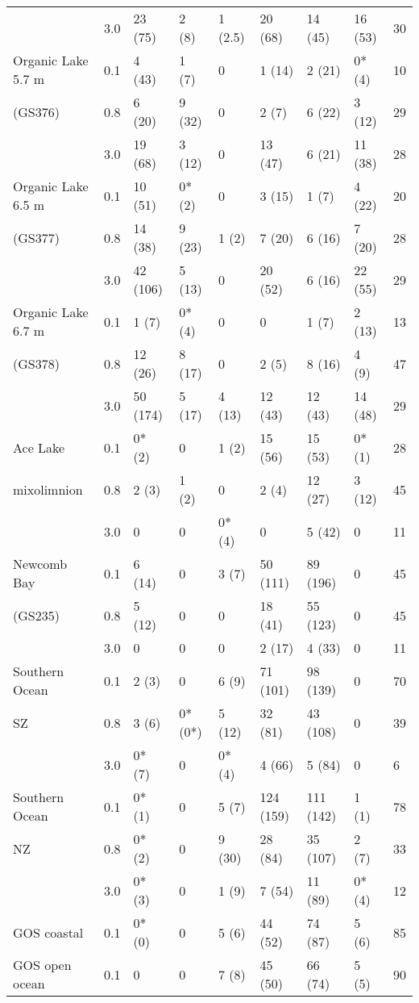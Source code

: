 \begin{longtable}{p{2.8cm}p{0.5cm}p{1.2cm}p{1cm}p{1cm}p{1.4cm}p{1.4cm}p{1.2cm}p{0.5cm}}
 & 3.0 & 23 (75) & 2 (8) & 1 (2.5) & 20 (68) & 14 (45) & 16 (53) & 30 \\
Organic Lake 5.7 m & 0.1 & 4 (43) & 1 (7) & 0 & 1 (14) & 2 (21) & 0* (4) & 10 \\
(GS376)  & 0.8 & 6 (20) & 9 (32) & 0 & 2 (7) & 6 (22) & 3 (12) & 29 \\
 & 3.0 & 19 (68) & 3 (12) & 0 & 13 (47) & 6 (21) & 11 (38) & 28 \\
Organic Lake 6.5 m  & 0.1 & 10 (51) & 0* (2) & 0 & 3 (15) & 1 (7) & 4 (22) & 20 \\
(GS377) & 0.8 & 14 (38) & 9 (23) & 1 (2) & 7 (20) & 6 (16) & 7 (20) & 28 \\
 & 3.0 & 42 (106) & 5 (13) & 0 & 20 (52) & 6 (16) & 22 (55) & 29 \\
Organic Lake 6.7 m  & 0.1 & 1 (7) & 0* (4) & 0 & 0 & 1 (7) & 2 (13) & 13 \\
(GS378) & 0.8 & 12 (26) & 8 (17) & 0 & 2 (5) & 8 (16) & 4 (9) & 47 \\
 & 3.0 & 50 (174) & 5 (17) & 4 (13) & 12 (43) & 12 (43) & 14 (48) & 29 \\
Ace Lake & 0.1 & 0* (2) & 0 & 1 (2) & 15 (56) & 15 (53) & 0* (1) & 28 \\
mixolimnion  & 0.8 & 2 (3) & 1 (2) & 0 & 2 (4) & 12 (27) & 3 (12) & 45 \\
 & 3.0 & 0 & 0 & 0* (4) & 0 & 5 (42) & 0 & 11 \\
Newcomb Bay & 0.1 & 6 (14) & 0 & 3 (7) & 50 (111) & 89 (196) & 0 & 45 \\
(GS235)  & 0.8 & 5 (12) & 0 & 0 & 18 (41) & 55 (123) & 0 & 45 \\
 & 3.0 & 0 & 0 & 0 & 2 (17) & 4 (33) & 0 & 11 \\
Southern Ocean & 0.1 & 2 (3) & 0 & 6 (9) & 71 (101) & 98 (139) & 0 & 70 \\
SZ  & 0.8 & 3 (6) & 0* (0*) & 5 (12) & 32 (81) & 43 (108) & 0 & 39 \\
 & 3.0 & 0* (7) & 0 & 0* (4) & 4 (66) & 5 (84) & 0 & 6 \\
Southern Ocean & 0.1 & 0* (1) & 0 & 5 (7) & 124 (159) & 111 (142) & 1 (1) & 78 \\
NZ  & 0.8 & 0* (2) & 0 & 9 (30) & 28 (84) & 35 (107) & 2 (7) & 33 \\
 & 3.0 & 0* (3) & 0 & 1 (9) & 7 (54) & 11 (89) & 0* (4) & 12 \\
GOS coastal & 0.1 & 0* (0) & 0 & 5 (6) & 44 (52) & 74 (87) & 5 (6) & 85 \\
GOS open ocean & 0.1 & 0 & 0 & 7 (8) & 45 (50) & 66 (74) & 5 (5) & 90 \\

\end{longtable}
